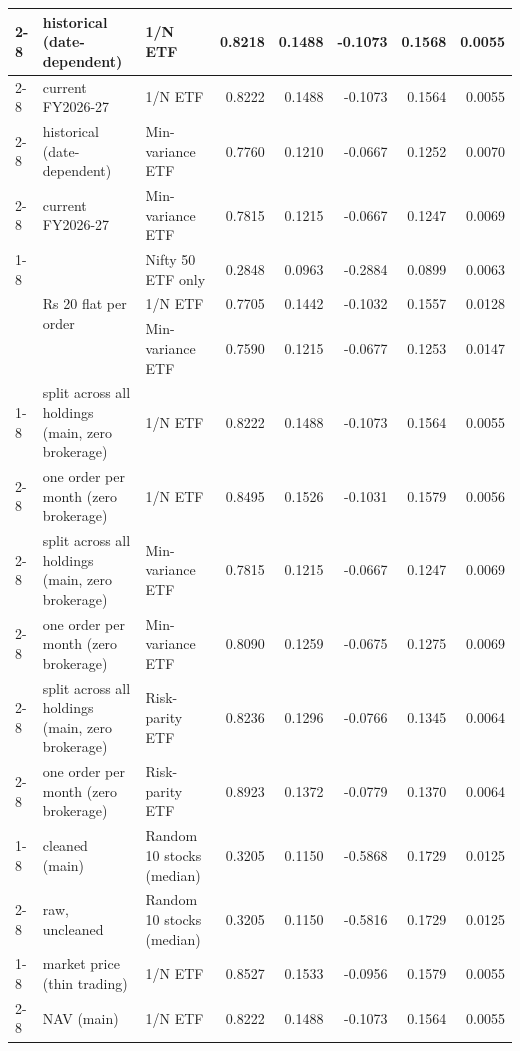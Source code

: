 \begin{table}
\begin{tabular}{lllrrrrr}
\cline{2-8}
 & historical (date-dependent) & 1/N ETF & 0.8218 & 0.1488 & -0.1073 & 0.1568 & 0.0055 \\
\cline{2-8}
 & current FY2026-27 & 1/N ETF & 0.8222 & 0.1488 & -0.1073 & 0.1564 & 0.0055 \\
\cline{2-8}
 & historical (date-dependent) & Min-variance ETF & 0.7760 & 0.1210 & -0.0667 & 0.1252 & 0.0070 \\
\cline{2-8}
 & current FY2026-27 & Min-variance ETF & 0.7815 & 0.1215 & -0.0667 & 0.1247 & 0.0069 \\
\cline{1-8} \cline{2-8}
\multirow[t]{3}{*}{brokerage} & \multirow[t]{3}{*}{Rs 20 flat per order} & Nifty 50 ETF only & 0.2848 & 0.0963 & -0.2884 & 0.0899 & 0.0063 \\
 &  & 1/N ETF & 0.7705 & 0.1442 & -0.1032 & 0.1557 & 0.0128 \\
 &  & Min-variance ETF & 0.7590 & 0.1215 & -0.0677 & 0.1253 & 0.0147 \\
\cline{1-8} \cline{2-8}
\multirow[t]{6}{*}{SIP order rule} & split across all holdings (main, zero brokerage) & 1/N ETF & 0.8222 & 0.1488 & -0.1073 & 0.1564 & 0.0055 \\
\cline{2-8}
 & one order per month (zero brokerage) & 1/N ETF & 0.8495 & 0.1526 & -0.1031 & 0.1579 & 0.0056 \\
\cline{2-8}
 & split across all holdings (main, zero brokerage) & Min-variance ETF & 0.7815 & 0.1215 & -0.0667 & 0.1247 & 0.0069 \\
\cline{2-8}
 & one order per month (zero brokerage) & Min-variance ETF & 0.8090 & 0.1259 & -0.0675 & 0.1275 & 0.0069 \\
\cline{2-8}
 & split across all holdings (main, zero brokerage) & Risk-parity ETF & 0.8236 & 0.1296 & -0.0766 & 0.1345 & 0.0064 \\
\cline{2-8}
 & one order per month (zero brokerage) & Risk-parity ETF & 0.8923 & 0.1372 & -0.0779 & 0.1370 & 0.0064 \\
\cline{1-8} \cline{2-8}
\multirow[t]{2}{*}{stock price cleaning} & cleaned (main) & Random 10 stocks (median) & 0.3205 & 0.1150 & -0.5868 & 0.1729 & 0.0125 \\
\cline{2-8}
 & raw, uncleaned & Random 10 stocks (median) & 0.3205 & 0.1150 & -0.5816 & 0.1729 & 0.0125 \\
\cline{1-8} \cline{2-8}
\multirow[t]{6}{*}{debt pricing} & market price (thin trading) & 1/N ETF & 0.8527 & 0.1533 & -0.0956 & 0.1579 & 0.0055 \\
\cline{2-8}
 & NAV (main) & 1/N ETF & 0.8222 & 0.1488 & -0.1073 & 0.1564 & 0.0055 \\

\end{tabular}
\end{table}
